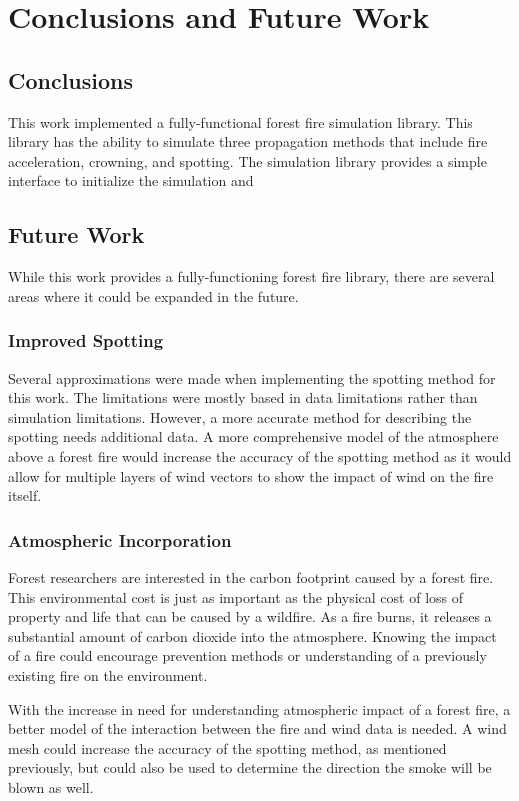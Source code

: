 \chapter{Conclusions and Future Work}
\label{chapter:conclusions}

\section{Conclusions}
This work implemented a fully-functional forest fire simulation library. This library has the ability to simulate three propagation methods that include fire acceleration, crowning, and spotting. The simulation library provides a simple interface to initialize the simulation and 

\section{Future Work}
While this work provides a fully-functioning forest fire library, there are several areas where it could be expanded in the future. 

\subsection{Improved Spotting} 
Several approximations were made when implementing the spotting method for this work. The limitations were mostly based in data limitations rather than simulation limitations. However, a more accurate method for describing the spotting needs additional data. A more comprehensive model of the atmosphere above a forest fire would increase the accuracy of the spotting method as it would allow for multiple layers of wind vectors to show the impact of wind on the fire itself. 

\subsection{Atmospheric Incorporation}
Forest researchers are interested in the carbon footprint caused by a forest fire. This environmental cost is just as important as the physical cost of loss of property and life that can be caused by a wildfire. As a fire burns, it releases a substantial amount of carbon dioxide into the atmosphere. Knowing the impact of a fire could encourage prevention methods or understanding of a previously existing fire on the environment. 

With the increase in need for understanding atmospheric impact of a forest fire, a better model of the interaction between the fire and wind data is needed. A wind mesh could increase the accuracy of the spotting method, as mentioned previously, but could also be used to determine the direction the smoke will be blown as well.

